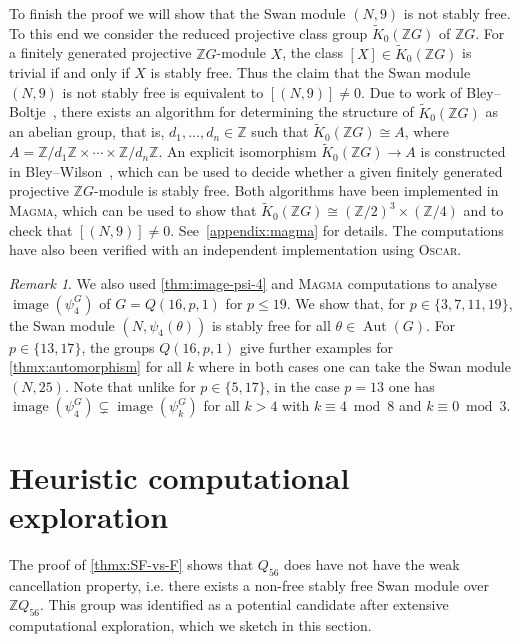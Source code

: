 \documentclass[11pt,leqno,a4paper]{amsart}
\newcommand{\Z}{\mathbb{Z}}
\DeclareMathOperator{\Aut}{Aut}
\DeclareMathOperator{\image}{image}
\theoremstyle{definition}
\theoremstyle{remark}
\newtheorem{remark}[thm]{Remark}
\theoremstyle{custom}
\newcommand{\wt}{\widetilde}
\begin{document}
To finish the proof we will show that the Swan module $(N, 9)$ is not stably free.
To this end we consider the reduced projective class group $\wt K_0(\Z G)$ of $\Z G$.
For a finitely generated projective $\Z G$-module $X$, the class $[X] \in \wt K_0(\Z G)$ is trivial if and only if $X$ is stably free.
Thus the claim that the Swan module $(N, 9)$ is not stably free is equivalent to $[(N, 9)] \neq 0$.
Due to work of Bley--Boltje~\cite{MR2282916}, there exists an algorithm for determining the structure of $\tilde K_0(\Z G)$ as an abelian group, that is, $d_1,\dotsc,d_n \in \Z$ such that $\wt K_0(\Z G) \cong A$, where $A = \Z/d_1\Z \times \dotsb \times \Z/d_n\Z$. An explicit isomorphism $\wt K_0(\Z G) \to A$ is constructed in Bley--Wilson~\cite{MR2564571}, which can be used to decide whether a given finitely generated projective $\Z G$-module is stably free.
Both algorithms have been implemented in \textsc{Magma}, which can be used to show that
$\wt K_0(\Z G) \cong (\Z/2)^3 \times (\Z/4)$
and to check that $[(N, 9)] \neq 0$. See~\cref{appendix:magma} for details.
The computations have also been verified with an independent implementation using \textsc{Oscar}\cite{Hecke,OSCAR-book}.

\begin{remark}
We also used \cref{thm:image-psi-4} and \textsc{Magma} computations to analyse $\image(\psi_4^G)$ of $G=Q(16,p,1)$ for $p \leq 19$.
We show that, for $p \in \{ 3, 7, 11, 19 \}$, the Swan module $(N, \psi_4(\theta))$ is stably free for all $\theta \in \Aut(G)$.
For $p \in \{13, 17\}$, the groups $Q(16, p, 1)$ give further examples for \cref{thmx:automorphism} for all $k$ where in both cases one can take the Swan module $(N, 25)$. Note that unlike for $p \in \{5, 17\}$, in the case $p = 13$ one has $\image(\psi_4^G) \subsetneq \image(\psi_k^G)$ for all $k > 4$ with $k \equiv 4 \bmod 8$ and $k \equiv 0 \bmod 3$.
\end{remark}

\appendix

\section{Heuristic computational exploration} \label{appendix:heuristics}

The proof of \cref{thmx:SF-vs-F} shows that $Q_{56}$ does have not have the weak cancellation property, i.e. 
there exists a non-free stably free Swan module over $\Z Q_{56}$.
This group was identified as a potential candidate after extensive computational exploration, which we sketch in this section.
\end{document}
